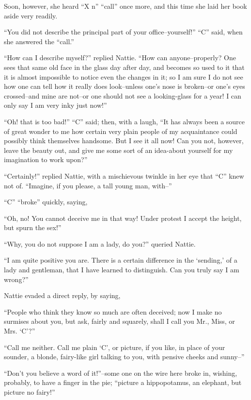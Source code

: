 Soon, however, she heard ``X n'' ``call'' once more, and this time she laid
her book aside very readily.

``You did not describe the principal part of your office--yourself!'' ``C''
said, when she answered the ``call.''

``How can I describe myself?'' replied Nattie. ``How can anyone--properly?
One sees that same old face in the glass day after day, and becomes so
used to it that it is almost impossible to notice even the changes in
it; so I am sure I do not see how one can tell how it really does
look--unless one's nose is broken--or one's eyes crossed--and mine are
not--or one should not see a looking-glass for a year! I can only say I
am very inky just now!''

``Oh! that is too bad!'' ``C'' said; then, with a laugh, ``It has always been
a source of great wonder to me how certain very plain people of my
acquaintance could possibly think themselves handsome. But I see it all
now! Can you not, however, leave the beauty out, and give me some sort
of an idea-about yourself for my imagination to work upon?''

``Certainly!'' replied Nattie, with a mischievous twinkle in her eye that
``C'' knew not of. ``Imagine, if you please, a tall young man, with--''

``C'' ``broke'' quickly, saying,

``Oh, no! You cannot deceive me in that way! Under protest I accept the
height, but spurn the sex!''

``Why, you do not suppose I am a lady, do you?'' queried Nattie.

``I am quite positive you are. There is a certain difference in the
`sending,' of a lady and gentleman, that I have learned to distinguish.
Can you truly say I am wrong?''

Nattie evaded a direct reply, by saying,

``People who think they know so much are often deceived; now I make no
surmises about you, but ask, fairly and squarely, shall I call you Mr.,
Miss, or Mrs. `C'?''

``Call me neither. Call me plain `C', or picture, if you like, in place
of your sounder, a blonde, fairy-like girl talking to you, with pensive
cheeks and sunny--''

``Don't you believe a word of it!''--some one on the wire here broke in,
wishing, probably, to have a finger in the pie; ``picture a hippopotamus,
an elephant, but picture no fairy!''

